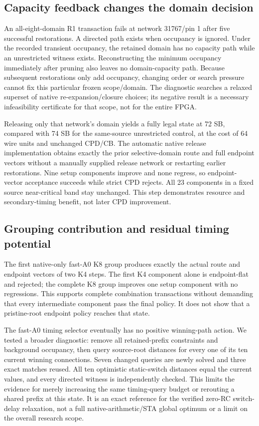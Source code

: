 \documentclass[conference,10pt]{IEEEtran}
\begin{document}
\subsection{Capacity feedback changes the domain decision}
An all-eight-domain R1 transaction fails at network 31767/pin 1 after five successful restorations. A directed path exists when occupancy is ignored. Under the recorded transient occupancy, the retained domain has no capacity path while an unrestricted witness exists. Reconstructing the minimum occupancy immediately after pruning also leaves no domain-capacity path. Because subsequent restorations only add occupancy, changing order or search pressure cannot fix this particular frozen scope/domain. The diagnostic searches a relaxed superset of native re-expansion/closure choices; its negative result is a necessary infeasibility certificate for that scope, not for the entire FPGA.

Releasing only that network's domain yields a fully legal state at 72 SB, compared with 74 SB for the same-source unrestricted control, at the cost of 64 wire units and unchanged CPD/CB. The automatic native release implementation obtains exactly the prior selective-domain route and full endpoint vectors without a manually supplied release network or restarting earlier restorations. Nine setup components improve and none regress, so endpoint-vector acceptance succeeds while strict CPD rejects. All 23 components in a fixed source near-critical band stay unchanged. This step demonstrates resource and secondary-timing benefit, not later CPD improvement.

\subsection{Grouping contribution and residual timing potential}
The first native-only fast-A0 K8 group produces exactly the actual route and endpoint vectors of two K4 steps. The first K4 component alone is endpoint-flat and rejected; the complete K8 group improves one setup component with no regressions. This supports complete combination transactions without demanding that every intermediate component pass the final policy. It does not show that a pristine-root endpoint policy reaches that state.

The fast-A0 timing selector eventually has no positive winning-path action. We tested a broader diagnostic: remove all retained-prefix constraints and background occupancy, then query source-root distances for every one of its ten current winning connections. Seven changed queries are newly solved and three exact matches reused. All ten optimistic static-switch distances equal the current values, and every directed witness is independently checked. This limits the evidence for merely increasing the same timing-query budget or rerouting a shared prefix at this state. It is an exact reference for the verified zero-RC switch-delay relaxation, not a full native-arithmetic/STA global optimum or a limit on the overall research scope.
\end{document}
